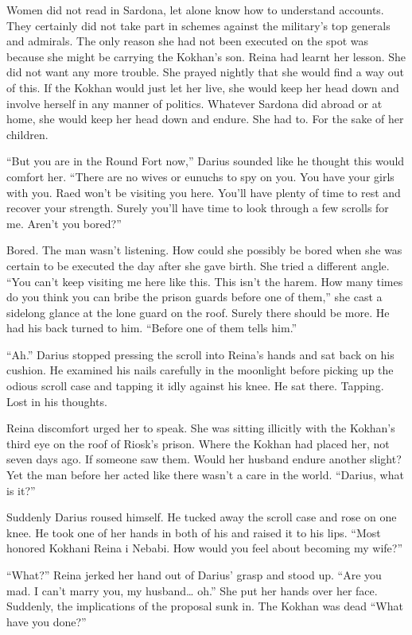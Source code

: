 \documentclass{article}
\begin{document}
	Women did not read in Sardona, let alone know how to understand accounts. They certainly did not take part in schemes against the military’s top generals and admirals. The only reason she had not been executed on the spot was because she might be carrying the Kokhan’s son. Reina had learnt her lesson. She did not want any more trouble. She prayed nightly that she would find a way out of this. If the Kokhan would just let her live, she would keep her head down and involve herself in any manner of politics. Whatever Sardona did abroad or at home, she would keep her head down and endure. She had to. For the sake of her children.
	
	“But you are in the Round Fort now,” Darius sounded like he thought this would comfort her. “There are no wives or eunuchs to spy on you. You have your girls with you. Raed won’t be visiting you here. You’ll have plenty of time to rest and recover your strength. Surely you’ll have time to look through a few scrolls for me. Aren’t you bored?” 
	
	Bored. The man wasn’t listening. How could she possibly be bored when she was certain to be executed the day after she gave birth. She tried a different angle. “You can’t keep visiting me here like this. This isn’t the harem. How many times do you think you can bribe the prison guards before one of them,” she cast a sidelong glance at the lone guard on the roof. Surely there should be more. He had his back turned to him. “Before one of them tells him.”
	
	“Ah.” Darius stopped pressing the scroll into Reina’s hands and sat back on his cushion. He examined his nails carefully in the moonlight before picking up the odious scroll case and tapping it idly against his knee. He sat there. Tapping. Lost in his thoughts. 
	
	Reina discomfort urged her to speak. She was sitting illicitly with the Kokhan’s third eye on the roof of Riosk’s prison. Where the Kokhan had placed her, not seven days ago. If someone saw them. Would her husband endure another slight? Yet the man before her acted like there wasn’t a care in the world. “Darius, what is it?”
	
	
	Suddenly Darius roused himself. He tucked away the scroll case and rose on one knee. He took one of her hands in both of his and raised it to his lips. “Most honored Kokhani Reina i Nebabi. How would you feel about becoming my wife?”
	
	“What?” Reina jerked her hand out of Darius’ grasp and stood up. “Are you mad. I can’t marry you, my husband… oh.”  She put her hands over her face. Suddenly, the implications of the proposal sunk in. The Kokhan was dead “What have you done?”
	
\end{document}
